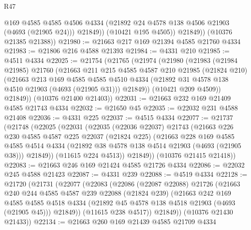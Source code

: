 \begin{lexlean}{R47}
\begin{coremodule}
                @169
                @4585
                @4585
                @4506
                @4334
                (@21892 @24 @4578 @138 @4506 @21903 (@4693 (@21905 @24)))
                @21849))
            (@10421 @195 @4505))
          @21849))
      (@10376 @21385 @21388))
@21980 := @21663 @217 @169 @21394 @4585 @21760 @4334
@21983 := @21806 @216 @4588 @21393
@21984 := @4331 @210
@21985 := @4511 @4334
@22025 := @21754
    (@21765
      (@21974
        (@21980
          (@21983
            (@21984 @21985)
            @21760
            (@21663
              @211
              @215
              @4585
              @4587
              @210
              @21985
              (@21824 @210)
              (@21663
                @213
                @169
                @4585
                @4585
                @4510
                @4334
                (@21892 @31 @4578 @138 @4510 @21903 (@4693 (@21905 @31)))
                @21849))
            (@10421 @209 @4509))
          @21849))
      (@10376 @21400 @21403))
@22031 := @21663 @232 @169 @21409 @4585 @21743 @4334
@22032 := @21650 @45
@22035 := @22032 @231 @4588 @21408
@22036 := @4331 @225
@22037 := @4515 @4334
@22077 := @21737
    (@21748
      (@22025
        (@22031
          (@22035
            (@22036 @22037)
            @21743
            (@21663
              @226
              @230
              @4585
              @4587
              @225
              @22037
              (@21824 @225)
              (@21663
                @228
                @169
                @4585
                @4585
                @4514
                @4334
                (@21892 @38 @4578 @138 @4514 @21903 (@4693 (@21905 @38)))
                @21849))
            (@11615 @224 @4513))
          @21849))
      (@10376 @21415 @21418))
@22083 := @21663 @246 @169 @21424 @4585 @21726 @4334
@22086 := @22032 @245 @4588 @21423
@22087 := @4331 @239
@22088 := @4519 @4334
@22128 := @21720
    (@21731
      (@22077
        (@22083
          (@22086
            (@22087 @22088)
            @21726
            (@21663
              @240
              @244
              @4585
              @4587
              @239
              @22088
              (@21824 @239)
              (@21663
                @242
                @169
                @4585
                @4585
                @4518
                @4334
                (@21892 @45 @4578 @138 @4518 @21903 (@4693 (@21905 @45)))
                @21849))
            (@11615 @238 @4517))
          @21849))
      (@10376 @21430 @21433))
@22134 := @21663 @260 @169 @21439 @4585 @21709 @4334

\end{coremodule}
\end{lexlean}
